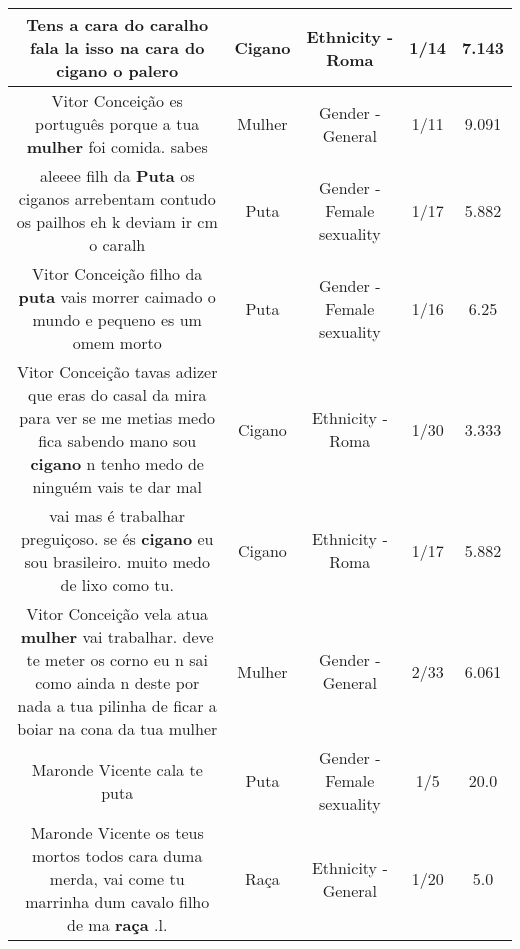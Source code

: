 \documentclass[11pt]{article}
\newlength\mylength
\begin{document}
\begin{center}
\begin{longtable}{|C{.65\mylength}|C{.30\mylength}|C{.12\mylength}|C{.12\mylength}|C{.12\mylength}|}
  \small Tens a cara do caralho fala la isso na cara do \textbf{cigano} o palero\normalsize   & Cigano & Ethnicity - Roma & 1/14 & 7.143 \\  \hline
  \small Vitor Conceição es português porque a tua \textbf{mulher} foi comida. sabes\normalsize   & Mulher & Gender - General & 1/11 & 9.091 \\  \hline
  \small aleeee filh da \textbf{Puta} os ciganos arrebentam contudo os pailhos eh k deviam ir cm o caralh\normalsize   & Puta & Gender - Female sexuality & 1/17 & 5.882 \\  \hline
  \small Vitor Conceição filho da \textbf{puta} vais morrer caimado o mundo e pequeno es um omem morto\normalsize   & Puta & Gender - Female sexuality & 1/16 & 6.25 \\  \hline
  \small Vitor Conceição tavas adizer que eras do casal da mira para ver se me metias medo fica sabendo mano sou \textbf{cigano} n tenho medo de ninguém vais te dar mal\normalsize   & Cigano & Ethnicity - Roma & 1/30 & 3.333 \\  \hline
  \small vai mas é trabalhar preguiçoso. se és \textbf{cigano} eu sou brasileiro. muito medo de lixo como tu.\normalsize   & Cigano & Ethnicity - Roma & 1/17 & 5.882 \\  \hline
  \small Vitor Conceição vela atua \textbf{mulher} vai trabalhar. deve te meter os corno eu n sai como ainda n deste por nada a tua pilinha de ficar a boiar na cona da tua mulher\normalsize   & Mulher & Gender - General & 2/33 & 6.061 \\  \hline
  \small Maronde Vicente cala te puta\normalsize   & Puta & Gender - Female sexuality & 1/5 & 20.0 \\  \hline
  \small Maronde Vicente os teus mortos todos cara duma merda, vai come tu marrinha dum cavalo filho de ma \textbf{raça} .l.\normalsize   & Raça & Ethnicity - General & 1/20 & 5.0 \\  \hline
  
\end{longtable}
\end{center}
\end{document}
